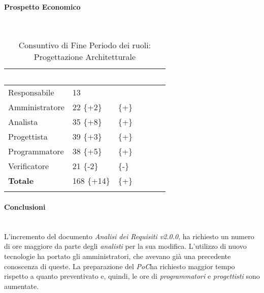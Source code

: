 \paragraph{Prospetto Economico} ~\\

\begin{longtable}{| C{.30\textwidth}| C{.15\textwidth}| C{.20\textwidth}|}
\hline
{}\textbf{\textcolor{white}{Ruolo}} & \textbf{\textcolor{white}{Ore}} & \textbf{\textcolor{white}{Costo in \euro}} \\
\hline 
Responsabile & 13 &  \\
\hline
{}Amministratore & 22 \{+2\} &  \{+\}\\
\hline
Analista & 35 \{+8\} &  \{+\}\\
\hline
{}Progettista & 39 \{+3\} &  \{+\}\\
\hline
Programmatore & 38 \{+5\} &  \{+\}\\
\hline
{}Verificatore & 21 \{-2\} &  \{-\}\\
\hline
\textbf{Totale} & 168 \{+14\} &  \{+\}\\ 
\hline

\caption{Consuntivo di Fine Periodo dei ruoli: Progettazione Architetturale}
\label{Distribuzione oraria per ruoli del periodo di pa}
\end{longtable}

\paragraph{Conclusioni} ~\\
L'incremento del documento \textit{Analisi dei Requisiti v2.0.0}, ha richiesto un numero di ore maggiore da parte degli \textit{analisti} per la sua modifica. L'utilizzo di nuovo tecnologie ha portato gli amministratori, che avevano già una precedente conoscenza di queste. La preparazione del \textit{PoC}\glossario ha richiesto maggior tempo rispetto a quanto preventivato e, quindi, le ore di \textit{programmatori} e \textit{progettisti} sono aumentate. 





